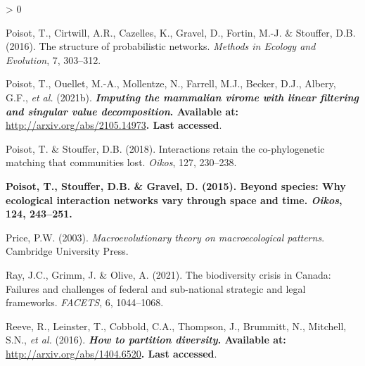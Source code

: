 \documentclass[11pt]{article}
\makeatletter
\def\maxwidth{\ifdim\Gin@nat@width>\linewidth\linewidth
\else\Gin@nat@width\fi}
\let\Oldincludegraphics\includegraphics
\renewcommand{\includegraphics}[1]{\Oldincludegraphics[width=\maxwidth]{#1}}
\newlength{\cslhangindent}
\newenvironment{CSLReferences}[3] %
 {%
  \setlength{\parindent}{0pt}
  \ifodd #1 \everypar{\setlength{\hangindent}{\cslhangindent}}\ignorespaces\fi
  \ifnum #2 > 0
  \setlength{\parskip}{#2\baselineskip}
  \fi
 }%
 {}
\providecommand{\DIFaddtex}[1]{{\bf #1}} %
\providecommand{\DIFdeltex}[1]{} %
\providecommand{\DIFaddbegin}{\protect\color{blue}} %
\providecommand{\DIFaddend}{\protect\color{black}} %
\providecommand{\DIFdelbegin}{\protect\color{red}} %
\providecommand{\DIFdelend}{\protect\color{black}} %
\providecommand{\DIFadd}[1]{\texorpdfstring{\DIFaddtex{#1}}{#1}} %
\providecommand{\DIFdel}[1]{\texorpdfstring{\DIFdeltex{#1}}{}} %
\newcommand{\DIFscaledelfig}{0.5}
\newlength{\DIFdelgraphicswidth} %
\newlength{\DIFdelgraphicsheight} %
\newcommand{\DIFaddincludegraphics}[2][]{{\color{blue}\fbox{\DIFOincludegraphics[#1]{#2}}}} %
\newcommand{\DIFdelincludegraphics}[2][]{%
\sbox{\DIFdelgraphicsbox}{\DIFOincludegraphics[#1]{#2}}%
\settoboxwidth{\DIFdelgraphicswidth}{\DIFdelgraphicsbox} %
\settoboxtotalheight{\DIFdelgraphicsheight}{\DIFdelgraphicsbox} %
\scalebox{\DIFscaledelfig}{%
\parbox[b]{\DIFdelgraphicswidth}{\usebox{\DIFdelgraphicsbox}\\[-\baselineskip] \rule{\DIFdelgraphicswidth}{0em}}\llap{\resizebox{\DIFdelgraphicswidth}{\DIFdelgraphicsheight}{%
\setlength{\unitlength}{\DIFdelgraphicswidth}%
\begin{picture}(1,1)%
\thicklines\linethickness{2pt} %
{\color[rgb]{1,0,0}\put(0,0){\framebox(1,1){}}}%
{\color[rgb]{1,0,0}\put(0,0){\line( 1,1){1}}}%
{\color[rgb]{1,0,0}\put(0,1){\line(1,-1){1}}}%
\end{picture}%
}\hspace*{3pt}}} %
} %
\DeclareRobustCommand{\DIFaddbegin}{\DIFOaddbegin \let\includegraphics\DIFaddincludegraphics} %
\DeclareRobustCommand{\DIFaddend}{\DIFOaddend \let\includegraphics\DIFOincludegraphics} %
\DeclareRobustCommand{\DIFdelbegin}{\DIFOdelbegin \let\includegraphics\DIFdelincludegraphics} %
\DeclareRobustCommand{\DIFdelend}{\DIFOaddend \let\includegraphics\DIFOincludegraphics} %
\makeatother
\begin{document}
\begin{CSLReferences}{1}{0}
\leavevmode\DIFdelbegin %
\DIFdel{Poisot, T., Canard, E., Mouillot, D., Mouquet, N. \& Gravel, D. (2012).
The dissimilarity of species interaction networks. \emph{Ecology
Letters}, 15, 1353--1361.
}%

\DIFdelend \hypertarget{ref-Poisot2016StrPro}{}%
Poisot, T., Cirtwill, A.R., Cazelles, K., Gravel, D., Fortin, M.-J. \&
Stouffer, D.B. (2016). The structure of probabilistic networks.
\emph{Methods in Ecology and Evolution}, 7, 303--312.

\leavevmode\hypertarget{ref-Poisot2021ImpMam}{}%
Poisot, T., Ouellet, M.-A., Mollentze, N., Farrell, M.J., Becker, D.J.,
Albery, G.F., \emph{et al.} (2021b). \DIFdelbegin \DIFdel{Imputing the mammalian virome with
linear filtering and singular value decomposition. \emph{arXiv:2105.14973 {[}q-bio{]}}}\DIFdelend \DIFaddbegin \DIFadd{\emph{Imputing the mammalian virome
with linear filtering and singular value decomposition}. Available at:
}\url{http://arxiv.org/abs/2105.14973}\DIFadd{. Last accessed}\DIFaddend .

\leavevmode\hypertarget{ref-Poisot2018IntRet}{}%
Poisot, T. \& Stouffer, D.B. (2018). Interactions retain the
co-phylogenetic matching that communities lost. \emph{Oikos}, 127,
230--238.

\leavevmode\DIFaddbegin \hypertarget{ref-Poisot2015SpeWhy}{}%
\DIFadd{Poisot, T., Stouffer, D.B. \& Gravel, D. (2015). Beyond species: Why
ecological interaction networks vary through space and time.
\emph{Oikos}, 124, 243--251.
}

\leavevmode\DIFaddend \hypertarget{ref-Price2003MacThe}{}%
Price, P.W. (2003). \emph{Macroevolutionary theory on macroecological
patterns}. Cambridge University Press.

\leavevmode\hypertarget{ref-Ray2021BioCri}{}%
Ray, J.C., Grimm, J. \& Olive, A. (2021). The biodiversity crisis in
Canada: Failures and challenges of federal and sub-national strategic
and legal frameworks. \emph{FACETS}, 6, 1044--1068.

\leavevmode\hypertarget{ref-Reeve2016HowPar}{}%
Reeve, R., Leinster, T., Cobbold, C.A., Thompson, J., Brummitt, N.,
Mitchell, S.N., \emph{et al.} (2016). \DIFdelbegin \DIFdel{How to partition diversity.
\emph{arXiv:1404.6520 {[}q-bio{]}}}\DIFdelend \DIFaddbegin \DIFadd{\emph{How to partition diversity}.
Available at: }\url{http://arxiv.org/abs/1404.6520}\DIFadd{. Last accessed}\DIFaddend .


\end{CSLReferences}
\end{document}
